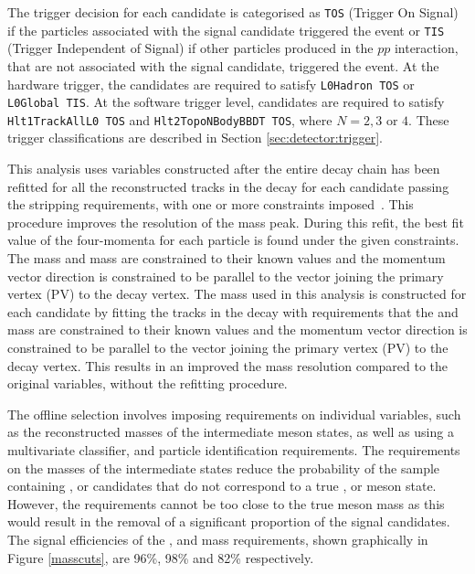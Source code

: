 The trigger decision for each candidate is categorised as {\tt TOS} (Trigger On Signal) if the particles associated with the signal candidate triggered the event or {\tt TIS} (Trigger Independent of Signal) if other particles produced in the $pp$ interaction, that are not associated with the signal candidate, triggered the event. At the hardware trigger, the \Bm candidates are required to satisfy {\tt L0Hadron TOS} or {\tt L0Global TIS}. At the software trigger level, \Bm candidates are required to satisfy {\tt Hlt1TrackAllL0 TOS} and {\tt Hlt2TopoNBodyBBDT TOS}, where $N = 2,3 \text{ or } 4$. These trigger classifications are described in Section \ref{sec:detector:trigger}.

This analysis uses variables constructed after the entire decay chain has been refitted for all the reconstructed tracks in the decay for each \Bm candidate passing the stripping requirements, with one or more constraints imposed~\cite{Hulsbergen:2005pu}. This procedure improves the resolution of the \Bm mass peak. During this refit, the best fit value of the four-momenta for each particle is found under the given constraints. The \Dz mass and \KS mass are constrained to their known values and the \Bm momentum vector direction is constrained to be parallel to the vector joining the primary vertex (PV) to the \Bm decay vertex. The \Bm mass used in this analysis is constructed for each \Bm candidate by fitting the tracks in the decay with requirements that the \Dz and \KS mass are constrained to their known values and the \Bm momentum vector direction is constrained to be parallel to the vector joining the primary vertex (PV) to the \Bm decay vertex. This results in an improved the \Bm mass resolution compared to the original variables, without the refitting procedure.

The offline selection involves imposing requirements on individual variables, such as the reconstructed masses of the intermediate meson states, as well as using a multivariate classifier, and particle identification requirements. The requirements on the masses of the intermediate states reduce the probability of the sample containing \Dz, \KS or \Kstar candidates that do not correspond to a true \Dz, \KS or \Kstar meson state. However, the requirements cannot be too close to the true meson mass as this would result in the removal of a significant proportion of the signal candidates. The signal efficiencies of the \Dz, \KS and \Kstar mass requirements, shown graphically in Figure \ref{masscuts}, are 96\%, 98\% and 82\% respectively. 

